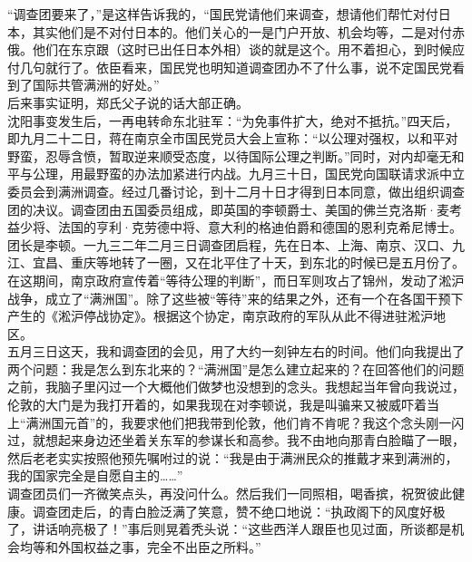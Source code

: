 “调查团要来了，”是这样告诉我的，“国民党请他们来调查，想请他们帮忙对付日本，其实他们是不对付日本的。他们关心的一是门户开放、机会均等，二是对付赤俄。他们在东京跟（这时已出任日本外相）谈的就是这个。用不着担心，到时候应付几句就行了。依臣看来，国民党也明知道调查团办不了什么事，说不定国民党看到了国际共管满洲的好处。”\\

后来事实证明，郑氏父子说的话大部正确。\\

沈阳事变发生后，一再电转命东北驻军：“为免事件扩大，绝对不抵抗。”四天后，即九月二十二日，蒋在南京全市国民党员大会上宣称：“以公理对强权，以和平对野蛮，忍辱含愤，暂取逆来顺受态度，以待国际公理之判断。”同时，对内却毫无和平与公理，用最野蛮的办法加紧进行内战。九月三十日，国民党向国联请求派中立委员会到满洲调查。经过几番讨论，到十二月十日才得到日本同意，做出组织调查团的决议。调查团由五国委员组成，即英国的李顿爵士、美国的佛兰克洛斯·麦考益少将、法国的亨利·克劳德中将、意大利的格迪伯爵和德国的恩利克希尼博士。团长是李顿。一九三二年二月三日调查团启程，先在日本、上海、南京、汉口、九江、宜昌、重庆等地转了一圈，又在北平住了十天，到东北的时候已是五月份了。在这期间，南京政府宣传着“等待公理的判断”，而日军则攻占了锦州，发动了淞沪战争，成立了“满洲国”。除了这些被“等待”来的结果之外，还有一个在各国干预下产生的《淞沪停战协定》。根据这个协定，南京政府的军队从此不得进驻淞沪地区。\\

五月三日这天，我和调查团的会见，用了大约一刻钟左右的时间。他们向我提出了两个问题：我是怎么到东北来的？“满洲国”是怎么建立起来的？在回答他们的问题之前，我脑子里闪过一个大概他们做梦也没想到的念头。我想起当年曾向我说过，伦敦的大门是为我打开着的，如果我现在对李顿说，我是叫骗来又被威吓着当上“满洲国元首”的，我要求他们把我带到伦敦，他们肯不肯呢？我这个念头刚一闪过，就想起来身边还坐着关东军的参谋长和高参。我不由地向那青白脸瞄了一眼，然后老老实实按照他预先嘱咐过的说：“我是由于满洲民众的推戴才来到满洲的，我的国家完全是自愿自主的……”\\

调查团员们一齐微笑点头，再没问什么。然后我们一同照相，喝香摈，祝贺彼此健康。调查团走后，的青白脸泛满了笑意，赞不绝口地说：“执政阁下的风度好极了，讲话响亮极了！”事后则晃着秃头说：“这些西洋人跟臣也见过面，所谈都是机会均等和外国权益之事，完全不出臣之所料。”\\

